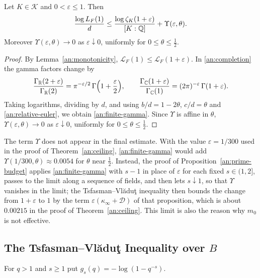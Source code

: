 \begin{lemma}\label{an:shift}
Let $K\in\mathcal K$ and $0<\varepsilon\le1$. Then
\begin{equation}\label{an:finite-gamma}
 \frac{\log L_F(1)}d
 \le\frac{\log\zeta_K(1+\varepsilon)}{[K:\mathbb Q]}+\Upsilon(\varepsilon,\theta).
\end{equation}
Moreover $\Upsilon(\varepsilon,\theta)\to0$ as $\varepsilon\downarrow0$,
uniformly for $0\le\theta\le\frac12$.
\end{lemma}

\begin{proof}
By Lemma~\ref{an:monotonicity},
$\mathcal L_F(1)\le\mathcal L_F(1+\varepsilon)$. In \eqref{an:completion}
the gamma factors change by
\[
 \frac{\Gamma_\mathbb R(2+\varepsilon)}{\Gamma_\mathbb R(2)}
 =\pi^{-\varepsilon/2}\,\Gamma\Bigl(1+\frac\varepsilon2\Bigr),\qquad
 \frac{\Gamma_\mathbb C(1+\varepsilon)}{\Gamma_\mathbb C(1)}
 =(2\pi)^{-\varepsilon}\,\Gamma(1+\varepsilon).
\]
Taking logarithms, dividing by $d$, and using $b/d=1-2\theta$, $c/d=\theta$
and \eqref{an:relative-euler}, we obtain \eqref{an:finite-gamma}. Since
$\Upsilon$ is affine in $\theta$, $\Upsilon(\varepsilon,\theta)\to0$ as
$\varepsilon\downarrow0$, uniformly for $0\le\theta\le\frac12$.
\end{proof}

The term $\Upsilon$ does not appear in the final estimate. With the value
$\varepsilon=1/300$ used in the proof of Theorem~\ref{an:ceiling},
\eqref{an:finite-gamma} would add $\Upsilon(1/300,\theta)\approx0.0054$ for
$\theta$ near $\frac12$. Instead, the proof of
Proposition~\ref{an:prime-budget} applies \eqref{an:finite-gamma} with
$s-1$ in place of $\varepsilon$ for each fixed $s\in(1,2]$, passes to the
limit along a sequence of fields, and then lets $s\downarrow1$, so that
$\Upsilon$ vanishes in the limit; the
Tsfasman--Vl\u{a}du\c{t} inequality then bounds the change from
$1+\varepsilon$ to $1$ by the term $\varepsilon(\kappa_\infty+\mathcal D)$
of that proposition, which is about $0.00215$ in the proof of
Theorem~\ref{an:ceiling}. This limit is also the reason why $m_0$ is not
effective.

\subsection{\texorpdfstring{The Tsfasman--Vl\u{a}du\c{t} Inequality over $B$}{The Tsfasman-Vladut Inequality over B}}
\label{an:budget-section}
For $q>1$ and $s\ge1$ put $g_s(q)=-\log(1-q^{-s})$.

